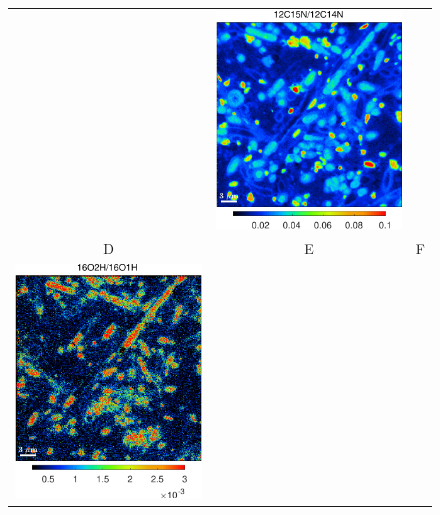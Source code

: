 \begin{figure}[!h]
\begin{tabular}{ccc}
&
\includegraphics[scale=\scf, valign=t]{figs8/12C15N-12C14N}
\\
D & E & F\\
\includegraphics[scale=\scf, valign=t]{figs8/16O2H-16O1H}

\end{tabular}
\end{figure}
